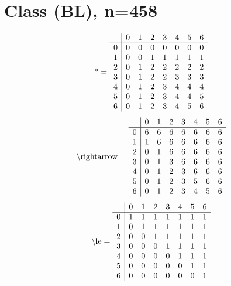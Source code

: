 \documentclass[11pt]{article}
\begin{document}
\section{Class (BL), n=458}
\[\text{*} = 
\begin{array}{r | r r r r r r r}
 & 0 & 1 & 2 & 3 & 4 & 5 & 6 \\ \hline
0 & 0 & 0 & 0 & 0 & 0 & 0 & 0 \\
1 & 0 & 0 & 1 & 1 & 1 & 1 & 1 \\
2 & 0 & 1 & 2 & 2 & 2 & 2 & 2 \\
3 & 0 & 1 & 2 & 2 & 3 & 3 & 3 \\
4 & 0 & 1 & 2 & 3 & 4 & 4 & 4 \\
5 & 0 & 1 & 2 & 3 & 4 & 4 & 5 \\
6 & 0 & 1 & 2 & 3 & 4 & 5 & 6 \\
\end{array}
\]
\[\text{\textbackslash rightarrow} = 
\begin{array}{r | r r r r r r r}
 & 0 & 1 & 2 & 3 & 4 & 5 & 6 \\ \hline
0 & 6 & 6 & 6 & 6 & 6 & 6 & 6 \\
1 & 1 & 6 & 6 & 6 & 6 & 6 & 6 \\
2 & 0 & 1 & 6 & 6 & 6 & 6 & 6 \\
3 & 0 & 1 & 3 & 6 & 6 & 6 & 6 \\
4 & 0 & 1 & 2 & 3 & 6 & 6 & 6 \\
5 & 0 & 1 & 2 & 3 & 5 & 6 & 6 \\
6 & 0 & 1 & 2 & 3 & 4 & 5 & 6 \\
\end{array}
\]
\[\text{\textbackslash le} = 
\begin{array}{r | r r r r r r r}
 & 0 & 1 & 2 & 3 & 4 & 5 & 6 \\ \hline
0 & 1 & 1 & 1 & 1 & 1 & 1 & 1 \\
1 & 0 & 1 & 1 & 1 & 1 & 1 & 1 \\
2 & 0 & 0 & 1 & 1 & 1 & 1 & 1 \\
3 & 0 & 0 & 0 & 1 & 1 & 1 & 1 \\
4 & 0 & 0 & 0 & 0 & 1 & 1 & 1 \\
5 & 0 & 0 & 0 & 0 & 0 & 1 & 1 \\
6 & 0 & 0 & 0 & 0 & 0 & 0 & 1 \\
\end{array}
\]
\end{document}
